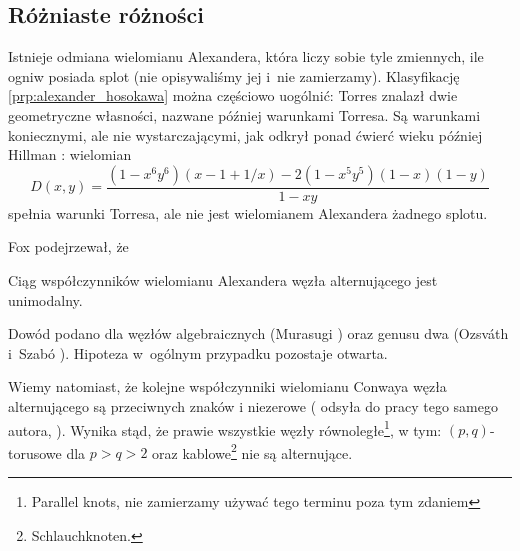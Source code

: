 
\subsection{Różniaste różności}
Istnieje odmiana wielomianu Alexandera, która liczy sobie tyle zmiennych, ile ogniw posiada splot (nie opisywaliśmy jej i~nie zamierzamy).
Klasyfikację \ref{prp:alexander_hosokawa} można częściowo uogólnić: Torres \cite{torres53} znalazł dwie geometryczne własności, nazwane później warunkami Torresa.
%
%
Są warunkami koniecznymi, ale nie wystarczającymi, jak odkrył ponad ćwierć wieku później Hillman \cite{hillman81}: wielomian
%
\begin{equation}
    D(x,y) = \frac{(1 - x^6y^6)(x - 1 + 1/x) - 2(1 - x^5y^5)(1 - x)(1 - y)}{1-xy}
\end{equation}
spełnia warunki Torresa, ale nie jest wielomianem Alexandera żadnego splotu.

Fox \cite{fox62} podejrzewał, że
%
\begin{conjecture}
%
    Ciąg współczynników wielomianu Alexandera węzła alternującego jest unimodalny.
\end{conjecture}
Dowód podano dla węzłów algebraicznych (Murasugi \cite{murasugi85}) oraz genusu dwa (Ozsváth i~Szabó \cite{ozsvath03}).
%
%
%
Hipoteza w~ogólnym przypadku pozostaje otwarta.

Wiemy natomiast, że kolejne współczynniki wielomianu Conwaya węzła alternującego są przeciwnych znaków i niezerowe (\cite[s. 242]{murasugi96} odsyła do pracy tego samego autora, \cite{murasugi59}).
Wynika stąd, że prawie wszystkie węzły równoległe\footnote{Parallel knots, nie zamierzamy używać tego terminu poza tym zdaniem}, w tym: $(p, q)$-torusowe dla $p > q > 2$ oraz kablowe\footnote{Schlauchknoten.} nie są alternujące.
%


